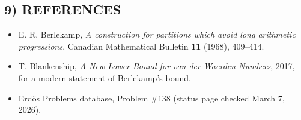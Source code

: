 \subsection*{9) REFERENCES}
\begin{itemize}
\item E. R. Berlekamp, \emph{A construction for partitions which avoid long arithmetic progressions}, Canadian Mathematical Bulletin \textbf{11} (1968), 409--414.
\item T. Blankenship, \emph{A New Lower Bound for van der Waerden Numbers}, 2017, for a modern statement of Berlekamp's bound.
\item Erd\H{o}s Problems database, Problem \#138 (status page checked March 7, 2026).
\end{itemize}


